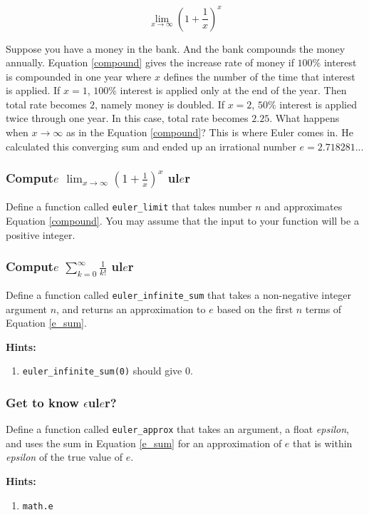 \documentclass[a4paper]{article}
\begin{document}
\begin{equation}
    \lim_{x \to \infty} \left(1 + \frac{1}{x}\right)^x
    \label{compound}
\end{equation}

Suppose you have a money in the bank. And the bank compounds the money annually. Equation \ref{compound} gives the increase rate of money if $100\%$ interest is compounded in one year where $x$ defines the number of the time that interest is applied. If $x=1$, $100\%$ interest is applied only at the end of the year. Then total rate becomes $2$, namely money is doubled. If $x=2$, $50\%$ interest is applied twice through one year. In this case, total rate becomes $2.25$. What happens when $x \to \infty$ as in the Equation \ref{compound}? This is where Euler comes in. He calculated this converging sum and ended up an irrational number $e=2.718281...$

\subsubsection{Comput$e$ $\lim_{x \to \infty}(1 + \frac{1}{x})^x$ ul$e$r}
Define a function called \texttt{euler\_limit} that takes number $n$ and approximates Equation \ref{compound}. You may assume that the input to your function will be a positive integer.

\subsubsection{Comput$e$ $\sum_{k=0}^{\infty}\frac{1}{k!}$ ul$e$r}
Define a function called \texttt{euler\_infinite\_sum} that takes a non-negative integer argument $n$, and returns an approximation to $e$ based on the first $n$ terms of Equation \ref{e_sum}.

\textbf{Hints:}
\begin{enumerate}
    \item \texttt{euler\_infinite\_sum(0)} should give $0$.
\end{enumerate}

\subsubsection{Get to know $\epsilon$ul$e$r?}
Define a function called \texttt{euler\_approx} that takes an argument, a float \textit{epsilon}, and uses the sum in Equation \ref{e_sum} for an approximation of $e$ that is within \textit{epsilon} of the true value of $e$. 

\textbf{Hints:}
\begin{enumerate}
    \item \texttt{math.e}
\end{enumerate}
\end{document}
